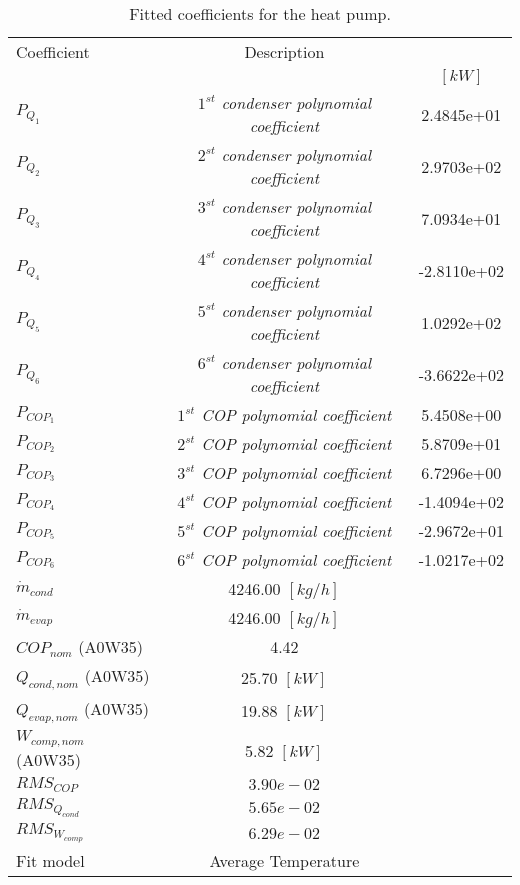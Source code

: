 \documentclass[english]{SPFShortReport}
\author{Dani Carbonell}
\begin{document}
\begin{table}[!ht]
\begin{small}
\caption{Fitted coefficients for the heat pump.}
\begin{center}
\resizebox{12cm}{!} 
{
\begin{tabular}{l | c c } 
\hline
\hline
Coefficient &Description & \\ 
 & &$[kW]$\\ 
\hline
$P_{Q_{1}}$ & \emph{$1^{st}$ condenser polynomial coefficient}  & 2.4845e+01    \\ 
$P_{Q_{2}}$ & \emph{$2^{st}$ condenser polynomial coefficient}  & 2.9703e+02    \\ 
$P_{Q_{3}}$ & \emph{$3^{st}$ condenser polynomial coefficient}  & 7.0934e+01    \\ 
$P_{Q_{4}}$ & \emph{$4^{st}$ condenser polynomial coefficient}  & -2.8110e+02    \\ 
$P_{Q_{5}}$ & \emph{$5^{st}$ condenser polynomial coefficient}  & 1.0292e+02    \\ 
$P_{Q_{6}}$ & \emph{$6^{st}$ condenser polynomial coefficient}  & -3.6622e+02    \\ 
\hline
$P_{COP_{1}}$ & \emph{$1^{st}$ COP polynomial coefficient}  & 5.4508e+00    \\ 
$P_{COP_{2}}$ & \emph{$2^{st}$ COP polynomial coefficient}  & 5.8709e+01    \\ 
$P_{COP_{3}}$ & \emph{$3^{st}$ COP polynomial coefficient}  & 6.7296e+00    \\ 
$P_{COP_{4}}$ & \emph{$4^{st}$ COP polynomial coefficient}  & -1.4094e+02    \\ 
$P_{COP_{5}}$ & \emph{$5^{st}$ COP polynomial coefficient}  & -2.9672e+01    \\ 
$P_{COP_{6}}$ & \emph{$6^{st}$ COP polynomial coefficient}  & -1.0217e+02    \\ 
\hline
$\dot m_{cond}$ & 4246.00 $[kg/h]$ \\ 
$\dot m_{evap}$ & 4246.00 $[kg/h]$ \\ 
\hline
$COP_{nom}$ (A0W35)& 4.42 \\ 
$Q_{cond,nom}$ (A0W35)& 25.70 $[kW]$\\ 
$Q_{evap,nom}$ (A0W35)& 19.88 $[kW]$\\ 
$W_{comp,nom}$ (A0W35)& 5.82 $[kW]$\\ 
\hline
 $RMS_{COP}$ & $3.90e-02$ \\ 
 $RMS_{Q_{cond}}$ & $5.65e-02$ \\ 
 $RMS_{W_{comp}}$ & $6.29e-02$ \\ 
\hline
Fit model & Average Temperature\\ 
\hline
\hline
\end{tabular}
}
\label{CoefTable}
\end{center}
\end{small}
\end{table}
\end{document}
